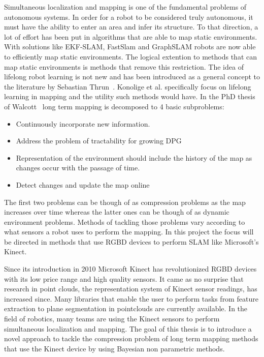 \documentclass[twoside,hidelinks]{article}
\begin{document}
Simultaneous localization and mapping is one of the fundamental problems of autonomous systems\cite{probRobs}. In order for a robot to be considered truly autonomous, it must have the ability to enter an area and infer its structure. To that direction, a lot of effort has been put in algorithms that are able to map static environments. With solutions like EKF-SLAM\cite{ekf}, FastSlam\cite{slam} and GraphSLAM\cite{graph} robots are now able to efficiently map static environments. 
The logical extention to methods that can map  static environments is methods that remove this restriction. The idea of lifelong robot learning is not new and has been introduced as a general concept to the literature by Sebastian Thrun~\cite{liflonglearning}. Konolige et al.\cite{lifelongmaps} specifically focus on lifelong learning in mapping and the utility such methods would have.  In the PhD thesis of Walcott~\cite{aishalong} long term mapping is decomposed to 4 basic subproblems:
\begin{itemize}
	\item{Continuously incorporate new information.}
	\item{Address the problem of tractability for growing DPG}
	\item{Representation of the environment should include the history of the map as changes occur	with the passage of time.}
	\item{Detect changes and update the map online}
\end{itemize}

The first two problems can be though of as compression problems as the map increases over time whereas the latter ones can be though of as dynamic environment problems. Methods of tackling those problems vary according to what sensors a robot uses to perform the mapping. In this project the focus will be directed in methods that use RGBD devices to perform SLAM like Microsoft's Kinect.

Since its introduction in 2010 Microsoft Kinect\cite{kinect} has revolutionized RGBD devices with its low price range and high quality sensors. It came as no surprise that research in point clouds, the representation system of Kinect sensor readings, has increased since. Many libraries that enable the user to perform tasks from feature extraction to plane segmentation\cite{pcl} in pointclouds are currently available. In the field of robotics, many teams are using the Kinect sensors to perform simultaneous localization and mapping\cite{rtabmap}. The goal of this thesis is to introduce a novel approach to tackle the compression problem of long term mapping methods that use the Kinect device by using Bayesian non parametric methods.
\end{document}
